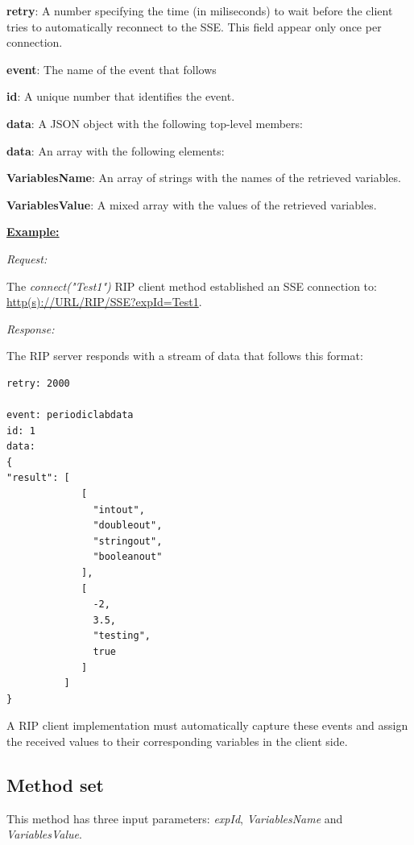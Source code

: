 \begin{myEnumerate}
    \item \textbf{retry}: A number specifying the time (in miliseconds) to wait before the client tries to automatically reconnect to the SSE. This field appear only once per connection.
    \item \textbf{event}: The name of the event that follows
    \item \textbf{id}: A unique number that identifies the event.
    \item \textbf{data}: A JSON object with the following top-level members:
    \begin{myEnumerate}
        \item \textbf{data}: An array with the following elements:
        \begin{myEnumerate}
        \item \textbf{VariablesName}: An array of strings with the names of the retrieved variables.
        \item \textbf{VariablesValue}: A mixed array with the values of the retrieved variables.
    \end{myEnumerate}
    \end{myEnumerate}
\end{myEnumerate}

\textbf{\underline{Example:}}

\textit{Request:}

The \textit{connect("Test1")} RIP client method established an SSE connection to: \url{http(s)://URL/RIP/SSE?expId=Test1}.

\textit{Response:}

The RIP server responds with a stream of data that follows this format:

\begin{lstlisting}
retry: 2000

event: periodiclabdata
id: 1
data: 
{
"result": [
             [
               "intout",
               "doubleout",
               "stringout",
               "booleanout"
             ],
             [
               -2,
               3.5,
               "testing",
               true
             ]
          ]
}
\end{lstlisting}

A RIP client implementation must automatically capture these events and assign the received values to their corresponding variables in the client side.

\subsection{Method set}
This method has three input parameters: \textit{expId}, \textit{VariablesName} and \textit{VariablesValue}.

